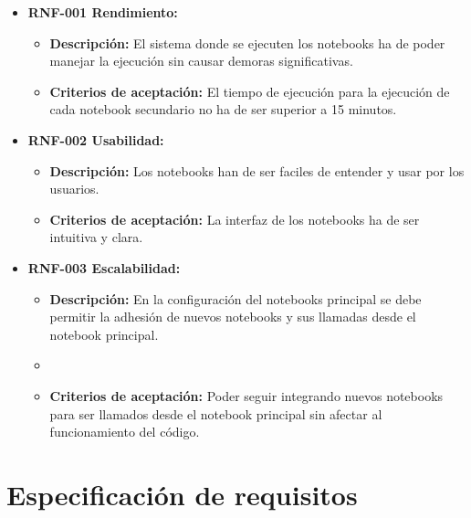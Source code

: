\begin{itemize}
\tightlist
\item
  \textbf{RNF-001 Rendimiento:}
 
  \begin{itemize}
  \tightlist
  \item
   \textbf{Descripción:} El sistema donde se ejecuten los notebooks ha de poder manejar la ejecución sin causar demoras significativas.
  \item
   \textbf{Criterios de aceptación:} El tiempo de ejecución para la ejecución de cada notebook secundario no ha de ser superior a 15 minutos.
  \end{itemize}


\item
  \textbf{RNF-002 Usabilidad:}
  
  \begin{itemize}
  \tightlist
  \item
    \textbf{Descripción:} Los notebooks han de ser faciles de entender y usar por los usuarios.
  \item
   \textbf{Criterios de aceptación:} La interfaz de los notebooks ha de ser intuitiva y clara.
  \end{itemize}
 
  
\item
  \textbf{RNF-003 Escalabilidad:}

  \begin{itemize}
  \tightlist
  \item
    \textbf{Descripción:} En la configuración del notebooks principal se debe permitir la adhesión de nuevos notebooks y sus llamadas desde el notebook principal.
  \item
  \item
    \textbf{Criterios de aceptación:} Poder seguir integrando nuevos notebooks para ser llamados desde el notebook principal sin afectar al funcionamiento del código. 
  \end{itemize}

\end{itemize}



\section{Especificación de requisitos}


